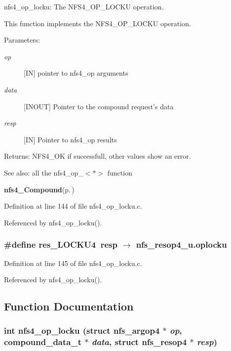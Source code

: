 nfs4\_\-op\_\-locku: The NFS4\_\-OP\_\-LOCKU operation.

This function implements the NFS4\_\-OP\_\-LOCKU operation.

\begin{Desc}
\item[Parameters:]
\begin{description}
\item[{\em op}][IN] pointer to nfs4\_\-op arguments \item[{\em data}][INOUT] Pointer to the compound request's data \item[{\em resp}][IN] Pointer to nfs4\_\-op results\end{description}
\end{Desc}
\begin{Desc}
\item[Returns:]NFS4\_\-OK if successfull, other values show an error.\end{Desc}
\begin{Desc}
\item[See also:]all the nfs4\_\-op\_\-$<$$\ast$$>$ function 

{\bf nfs4\_\-Compound}{\rm (p.\,\pageref{nfs4__Compound_8c_a4})} \end{Desc}


Definition at line 144 of file nfs4\_\-op\_\-locku.c.

Referenced by nfs4\_\-op\_\-locku().
\subsubsection{\setlength{\rightskip}{0pt plus 5cm}\#define res\_\-LOCKU4\ resp $\rightarrow$ nfs\_\-resop4\_\-u.oplocku}\label{nfs4__op__locku_8c_a1}




Definition at line 145 of file nfs4\_\-op\_\-locku.c.

Referenced by nfs4\_\-op\_\-locku().

\subsection{Function Documentation}
\subsubsection{\setlength{\rightskip}{0pt plus 5cm}int nfs4\_\-op\_\-locku (struct nfs\_\-argop4 $\ast$ {\em op}, compound\_\-data\_\-t $\ast$ {\em data}, struct nfs\_\-resop4 $\ast$ {\em resp})}\label{nfs4__op__locku_8c_a2}




